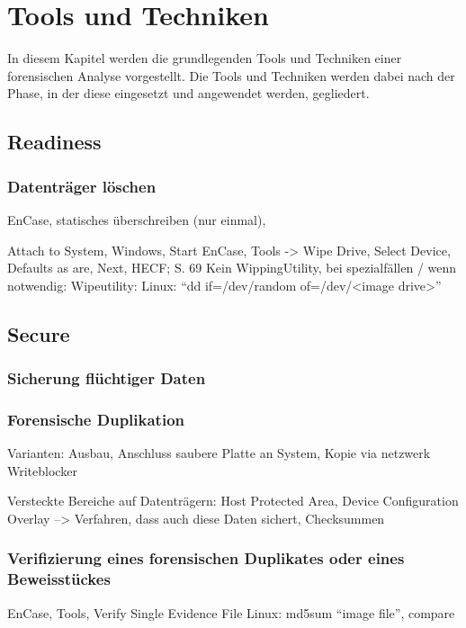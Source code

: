 \chapter{Tools und Techniken} \label{chap:ToolsTechniques}
In diesem Kapitel werden die grundlegenden Tools und Techniken einer forensischen Analyse vorgestellt. Die Tools und Techniken werden dabei nach der Phase, in der diese eingesetzt und angewendet werden, gegliedert.



\section{Readiness}

\subsection{Datenträger löschen}
EnCase, statisches überschreiben (nur einmal), 

Attach to System, Windows, Start EnCase, Tools -> Wipe Drive, Select Device, Defaults as are, Next, HECF; S. 69
Kein WippingUtility, bei spezialfällen / wenn notwendig: Wipeutility: Linux: "`dd if=/dev/random of=/dev/<image drive>"'


\section{Secure}

\subsection{Sicherung flüchtiger Daten}


\subsection{Forensische Duplikation}
Varianten: Ausbau, Anschluss saubere Platte an System, Kopie via netzwerk
Writeblocker

Versteckte Bereiche auf Datenträgern: Host Protected Area, Device Configuration Overlay --> Verfahren, dass auch diese Daten sichert, Checksummen

\subsection{Verifizierung eines forensischen Duplikates oder eines Beweisstückes}
EnCase, Tools, Verify Single Evidence File
Linux: md5sum "`image file"', compare


